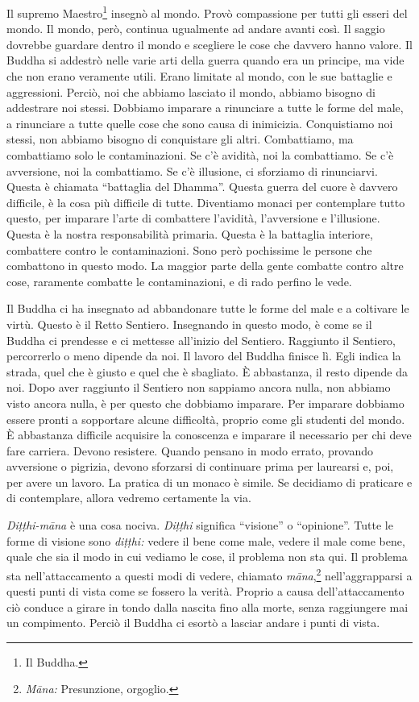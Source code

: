 Il supremo Maestro\footnote{Il Buddha.} insegnò al mondo. Provò
compassione per tutti gli esseri del mondo. Il mondo, però, continua
ugualmente ad andare avanti così. Il saggio dovrebbe guardare dentro il
mondo e scegliere le cose che davvero hanno valore. Il Buddha si
addestrò nelle varie arti della guerra quando era un principe, ma vide
che non erano veramente utili. Erano limitate al mondo, con le sue
battaglie e aggressioni. Perciò, noi che abbiamo lasciato il mondo,
abbiamo bisogno di addestrare noi stessi. Dobbiamo imparare a rinunciare
a tutte le forme del male, a rinunciare a tutte quelle cose che sono
causa di inimicizia. Conquistiamo noi stessi, non abbiamo bisogno di
conquistare gli altri. Combattiamo, ma combattiamo solo le
contaminazioni. Se c'è avidità, noi la combattiamo. Se c'è avversione,
noi la combattiamo. Se c'è illusione, ci sforziamo di rinunciarvi.
Questa è chiamata ``battaglia del Dhamma''. Questa guerra del cuore è
davvero difficile, è la cosa più difficile di tutte. Diventiamo monaci
per contemplare tutto questo, per imparare l'arte di combattere
l'avidità, l'avversione e l'illusione. Questa è la nostra responsabilità
primaria. Questa è la battaglia interiore, combattere contro le
contaminazioni. Sono però pochissime le persone che combattono in questo
modo. La maggior parte della gente combatte contro altre cose, raramente
combatte le contaminazioni, e di rado perfino le vede.

Il Buddha ci ha insegnato ad abbandonare tutte le forme del male e a
coltivare le virtù. Questo è il Retto Sentiero. Insegnando in questo
modo, è come se il Buddha ci prendesse e ci mettesse all'inizio del
Sentiero. Raggiunto il Sentiero, percorrerlo o meno dipende da noi. Il
lavoro del Buddha finisce lì. Egli indica la strada, quel che è giusto e
quel che è sbagliato. È abbastanza, il resto dipende da noi. Dopo aver
raggiunto il Sentiero non sappiamo ancora nulla, non abbiamo visto
ancora nulla, è per questo che dobbiamo imparare. Per imparare dobbiamo
essere pronti a sopportare alcune difficoltà, proprio come gli studenti
del mondo. È abbastanza difficile acquisire la conoscenza e imparare il
necessario per chi deve fare carriera. Devono resistere. Quando pensano
in modo errato, provando avversione o pigrizia, devono sforzarsi di
continuare prima per laurearsi e, poi, per avere un lavoro. La pratica
di un monaco è simile. Se decidiamo di praticare e di contemplare,
allora vedremo certamente la via.

\emph{Diṭṭhi-māna} è una cosa nociva. \emph{Diṭṭhi} significa
``visione'' o ``opinione''. Tutte le forme di visione sono
\emph{diṭṭhi:} vedere il bene come male, vedere il male come bene, quale
che sia il modo in cui vediamo le cose, il problema non sta qui. Il
problema sta nell'attaccamento a questi modi di vedere, chiamato
\emph{māna},\footnote{\emph{Māna:} Presunzione, orgoglio.}
nell'aggrapparsi a questi punti di vista come se fossero la verità.
Proprio a causa dell'attaccamento ciò conduce a girare in tondo dalla
nascita fino alla morte, senza raggiungere mai un compimento. Perciò il
Buddha ci esortò a lasciar andare i punti di vista.

